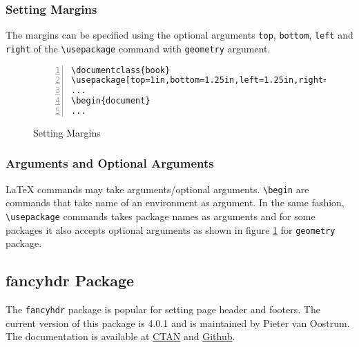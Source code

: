 \documentclass{article}
\begin{document}
\subsubsection{Setting Margins}
	The margins can be specified using the optional arguments \texttt{top}, \texttt{bottom}, \texttt{left} and \texttt{right} of the \texttt{\textbackslash usepackage} command with \texttt{geometry} argument.

\begin{figure}[h]
\centering
\begin{Verbatim}[numbers = left]
\documentclass{book}
\usepackage[top=1in,bottom=1.25in,left=1.25in,right=1.25in}{geometry}
...
\begin{document}
...
\end{Verbatim}
\caption{Setting Margins}
\label{fig:geometry}
\end{figure}

\subsubsection{Arguments and Optional Arguments}
	\LaTeX{} commands may take arguments/optional arguments. \texttt{\textbackslash begin} are commands that take name of an environment as argument. In the same fashion, \texttt{\textbackslash usepackage} commands takes package names as arguments and for some packages it also accepts optional arguments as shown in figure \ref{fig:geometry} for \texttt{geometry} package.

\subsection{fancyhdr Package}
	The \texttt{fancyhdr} package is popular for setting page header and footers. The current version of this package is 4.0.1 and is maintained by Pieter van Oostrum. The documentation is available at \href{https://ctan.org/pkg/fancyhdr}{CTAN} and \href{https://github.com/pietvo/fancyhdr}{Github}.
\end{document}
